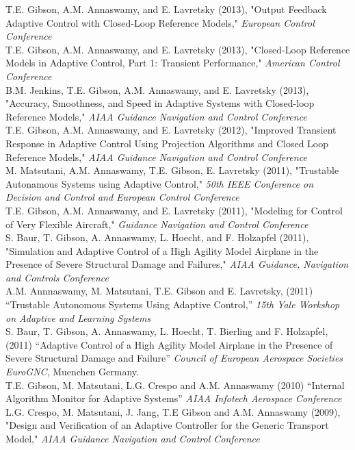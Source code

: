 \documentclass[10pt, letterpaper]{article}
\newcommand{\years}[1]{\marginnote{\scriptsize #1}}
\begin{document}
\years{2013} T.E. Gibson, A.M. Annaswamy, and E. Lavretsky (2013), "Output Feedback Adaptive Control with Closed-Loop Reference Models," {\em European Control Conference}\\[0.1cm]
\years{2013} T.E. Gibson, A.M. Annaswamy, and E. Lavretsky (2013), "Closed-Loop Reference Models in Adaptive Control, Part 1: Transient Performance," {\em American Control Conference} \\[0.1cm]
\years{2013} B.M. Jenkins, T.E. Gibson, A.M. Annaswamy, and E. Lavretsky (2013), "Accuracy, Smoothness, and Speed in Adaptive Systems with Closed-loop Reference Models," {\em AIAA Guidance Navigation and Control Conference}\\[0.1cm]
\years{2012} T.E. Gibson, A.M. Annaswamy, and E. Lavretsky (2012), "Improved Transient Response in Adaptive Control Using Projection Algorithms and Closed Loop Reference Models," {\em AIAA Guidance Navigation and Control Conference}\\[0.1cm]
\years{2011} M. Matsutani, A.M. Annaswamy, T.E. Gibson, E. Lavretsky (2011), "Trustable Autonamous Systems using Adaptive Control," {\em 50th IEEE Conference on Decision and Control and European Control Conference} \\[0.1cm]
\years{2011} T.E. Gibson, A.M. Annaswamy, and E. Lavretsky (2011), "Modeling for Control of Very Flexible Aircraft," {\em Guidance Navigation and Control Conference}\\[0.1cm]
\years{2011} S. Baur, T. Gibson, A. Annaswamy, L. Hoecht, and F. Holzapfel (2011), "Simulation and Adaptive Control of a High Agility Model Airplane in the Presence of Severe Structural Damage and Failures," {\em AIAA Guidance, Navigation and Controls Conference}\\[0.1cm]
\years{2011} A.M. Annnaswamy, M. Matsutani, T.E. Gibson and E. Lavretsky, (2011) ``Trustable Autonomous Systems Using Adaptive Control,'' {\em 15th Yale Workshop on Adaptive and Learning Systems}\\[0.1cm]
\years{2011} S. Baur, T. Gibson, A. Annaswamy, L. Hoecht, T. Bierling and F. Holzapfel, (2011) ``Adaptive Control of a High Agility Model Airplane in the Presence of Severe Structural Damage and Failure'' {\em Council of European Aerospace Societies EuroGNC},  Muenchen Germany.\\[0.1cm]
\years{2010} T.E. Gibson, M. Matsutani, L.G. Crespo and A.M. Annaswamy (2010) ``Internal Algorithm Monitor for Adaptive Systems'' {\em AIAA Infotech Aerospace Conference}\\[0.1cm]
\years{2009} L.G. Crespo, M. Matsutani, J. Jang, T.E Gibson and A.M. Annaswamy (2009), "Design and Verification of an Adaptive Controller for the Generic Transport Model,"  {\em AIAA Guidance Navigation and Control Conference}\\[0.1cm]
\end{document}
